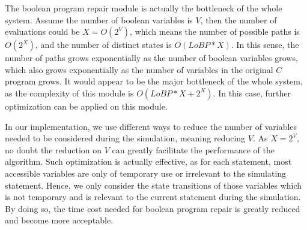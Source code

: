 The boolean program repair module is actually the bottleneck of the whole system.
Assume the number of boolean variables is $V$, then the number of evaluations could be $X = O(2^{V})$, which means the number of possible paths is $O(2^{X})$, and the number of distinct states is $O(LoBP * X)$. In this sense, the number of paths grows exponentially as the number of boolean variables grows, which also grows exponentially as the number of variables in the original $C$ program grows. It would appear to be the major bottleneck of the whole system, as the complexity of this module is $O(LoBP * X + 2^{X})$.
In this case, further optimization can be applied on this module.

In our implementation, we use different ways to reduce the number of variables needed to be considered during the simulation, meaning reducing $V$.
As $X = 2^{V}$, no doubt the reduction on $V$ can greatly facilitate the performance of the algorithm.
Such optimization is actually effective, as for each statement, most accessible variables are only of temporary use or irrelevant to the simulating statement.
Hence, we only consider the state transitions of those variables which is not temporary and is relevant to the current statement during the simulation.
By doing so, the time cost needed for boolean program repair is greatly reduced and become more acceptable.

